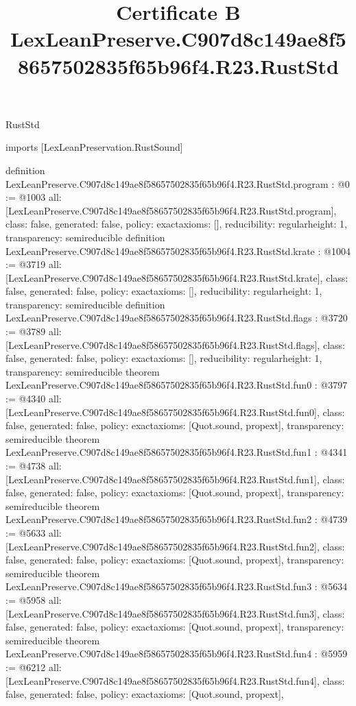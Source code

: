 \begin{lexlean}{RustStd}
\title{Certificate B LexLeanPreserve.C907d8c149ae8f58657502835f65b96f4.R23.RustStd}
\begin{coremodule}
imports [LexLeanPreservation.RustSound]

definition LexLeanPreserve.C907d8c149ae8f58657502835f65b96f4.R23.RustStd.program : @0 := @1003 {
  all: [LexLeanPreserve.C907d8c149ae8f58657502835f65b96f4.R23.RustStd.program],
  class: false,
  generated: false,
  policy: exact{axioms: []},
  reducibility: regular{height: 1},
  transparency: semireducible
}
definition LexLeanPreserve.C907d8c149ae8f58657502835f65b96f4.R23.RustStd.krate : @1004 := @3719 {
  all: [LexLeanPreserve.C907d8c149ae8f58657502835f65b96f4.R23.RustStd.krate],
  class: false,
  generated: false,
  policy: exact{axioms: []},
  reducibility: regular{height: 1},
  transparency: semireducible
}
definition LexLeanPreserve.C907d8c149ae8f58657502835f65b96f4.R23.RustStd.flags : @3720 := @3789 {
  all: [LexLeanPreserve.C907d8c149ae8f58657502835f65b96f4.R23.RustStd.flags],
  class: false,
  generated: false,
  policy: exact{axioms: []},
  reducibility: regular{height: 1},
  transparency: semireducible
}
theorem LexLeanPreserve.C907d8c149ae8f58657502835f65b96f4.R23.RustStd.fun0 : @3797 := @4340 {
  all: [LexLeanPreserve.C907d8c149ae8f58657502835f65b96f4.R23.RustStd.fun0],
  class: false,
  generated: false,
  policy: exact{axioms: [Quot.sound, propext]},
  transparency: semireducible
}
theorem LexLeanPreserve.C907d8c149ae8f58657502835f65b96f4.R23.RustStd.fun1 : @4341 := @4738 {
  all: [LexLeanPreserve.C907d8c149ae8f58657502835f65b96f4.R23.RustStd.fun1],
  class: false,
  generated: false,
  policy: exact{axioms: [Quot.sound, propext]},
  transparency: semireducible
}
theorem LexLeanPreserve.C907d8c149ae8f58657502835f65b96f4.R23.RustStd.fun2 : @4739 := @5633 {
  all: [LexLeanPreserve.C907d8c149ae8f58657502835f65b96f4.R23.RustStd.fun2],
  class: false,
  generated: false,
  policy: exact{axioms: [Quot.sound, propext]},
  transparency: semireducible
}
theorem LexLeanPreserve.C907d8c149ae8f58657502835f65b96f4.R23.RustStd.fun3 : @5634 := @5958 {
  all: [LexLeanPreserve.C907d8c149ae8f58657502835f65b96f4.R23.RustStd.fun3],
  class: false,
  generated: false,
  policy: exact{axioms: [Quot.sound, propext]},
  transparency: semireducible
}
theorem LexLeanPreserve.C907d8c149ae8f58657502835f65b96f4.R23.RustStd.fun4 : @5959 := @6212 {
  all: [LexLeanPreserve.C907d8c149ae8f58657502835f65b96f4.R23.RustStd.fun4],
  class: false,
  generated: false,
  policy: exact{axioms: [Quot.sound, propext]},
}
\end{coremodule}
\end{lexlean}
